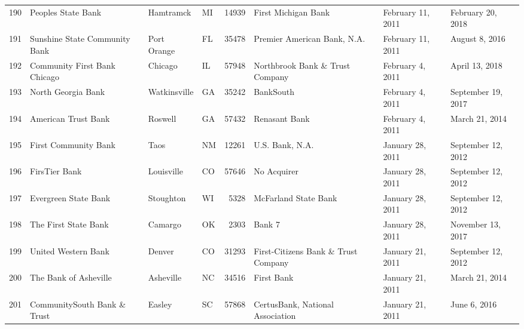 \begin{tabular}{llllrlll}
190 &                                 Peoples State Bank &           Hamtramck &  MI &  14939 &                                First Michigan Bank &   February 11, 2011 &   February 20, 2018 \\
191 &                      Sunshine State Community Bank &         Port Orange &  FL &  35478 &                        Premier American Bank, N.A. &   February 11, 2011 &      August 8, 2016 \\
192 &                       Community First Bank Chicago &             Chicago &  IL &  57948 &                    Northbrook Bank \& Trust Company &    February 4, 2011 &      April 13, 2018 \\
193 &                                 North Georgia Bank &        Watkinsville &  GA &  35242 &                                          BankSouth &    February 4, 2011 &  September 19, 2017 \\
194 &                                American Trust Bank &             Roswell &  GA &  57432 &                                      Renasant Bank &    February 4, 2011 &      March 21, 2014 \\
195 &                               First Community Bank &                Taos &  NM &  12261 &                                    U.S. Bank, N.A. &    January 28, 2011 &  September 12, 2012 \\
196 &                                      FirsTier Bank &          Louisville &  CO &  57646 &                                        No Acquirer &    January 28, 2011 &  September 12, 2012 \\
197 &                               Evergreen State Bank &           Stoughton &  WI &   5328 &                               McFarland State Bank &    January 28, 2011 &  September 12, 2012 \\
198 &                               The First State Bank &             Camargo &  OK &   2303 &                                             Bank 7 &    January 28, 2011 &   November 13, 2017 \\
199 &                                United Western Bank &              Denver &  CO &  31293 &                First-Citizens Bank \& Trust Company &    January 21, 2011 &  September 12, 2012 \\
200 &                              The Bank of Asheville &           Asheville &  NC &  34516 &                                         First Bank &    January 21, 2011 &      March 21, 2014 \\
201 &                        CommunitySouth Bank \& Trust &              Easley &  SC &  57868 &                   CertusBank, National Association &    January 21, 2011 &        June 6, 2016 \\

\end{tabular}
